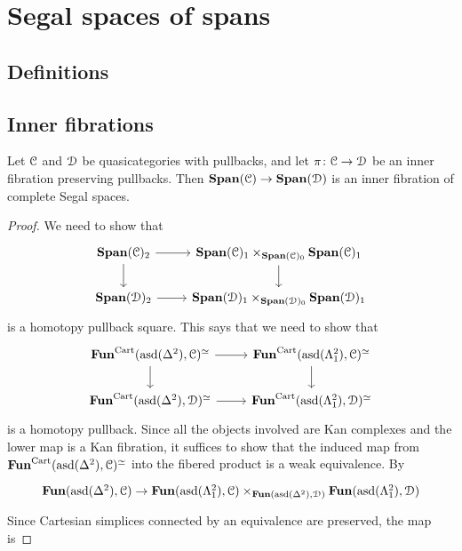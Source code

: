 \documentclass[main.tex]{subfiles}
\begin{document}
\section{Segal spaces of spans}
\label{sec:segal_spaces_of_spans}


\subsection{Definitions}
\label{ssc:definitions}

\subsection{Inner fibrations}
\label{ssc:inner_fibrations}

\begin{theorem}
  Let $\mathcal{C}$ and $\mathcal{D}$ be quasicategories with pullbacks, and let $\pi\colon \mathcal{C} \to \mathcal{D}$ be an inner fibration preserving pullbacks. Then $\mathbf{Span}(\mathcal{C}) \to \mathbf{Span}(\mathcal{D})$ is an inner fibration of complete Segal spaces.
\end{theorem}
\begin{proof}
  We need to show that
  \begin{equation*}
    \begin{tikzcd}
      \Span(\category{C})_{2}
      \arrow[r]
      \arrow[d]
      & \Span(\category{C})_{1} \times_{\Span(\category{C})_{0}} \Span(\category{C})_{1}
      \arrow[d]
      \\
      \Span(\category{D})_{2}
      \arrow[r]
      & \Span(\category{D})_{1} \times_{\Span(\category{D})_{0}} \Span(\category{D})_{1}
    \end{tikzcd}
  \end{equation*}
  is a homotopy pullback square. This says that we need to show that
  \begin{equation*}
    \begin{tikzcd}
      \Fun^{\Cart}(\asd(\Delta^{2}), \category{C})^{\simeq}
      \arrow[r]
      \arrow[d]
      & \Fun^{\Cart}(\asd(\Lambda^{2}_{1}), \category{C})^{\simeq}
      \arrow[d]
      \\
      \Fun^{\Cart}(\asd(\Delta^{2}), \category{D})^{\simeq}
      \arrow[r]
      & \Fun^{\Cart}(\asd(\Lambda^{2}_{1}), \category{D})^{\simeq}
    \end{tikzcd}
  \end{equation*}
  is a homotopy pullback. Since all the objects involved are Kan complexes and the lower map is a Kan fibration, it suffices to show that the induced map from $\mathbf{Fun}^{\mathrm{Cart}}(\mathrm{asd}(\Delta^{2}), \mathcal{C})^{\simeq}$ into the fibered product is a weak equivalence. By
  \begin{equation*}
    \begin{tikzcd}
      \Fun(\asd(\Delta^{2}), \category{C}) \to \Fun(\asd(\Lambda^{2}_{1}), \category{C}) \times_{\Fun(\asd(\Delta^{2}), \category{D})} \Fun(\asd(\Lambda^{2}_{1}), \category{D})
    \end{tikzcd}
  \end{equation*}
  Since Cartesian simplices connected by an equivalence are preserved, the map
  is
\end{proof}
\end{document}
